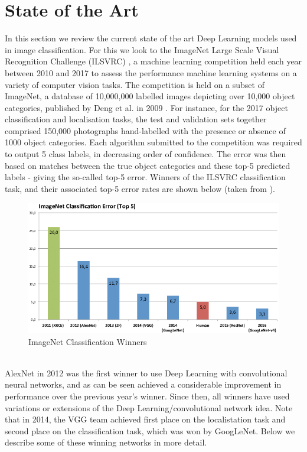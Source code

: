 \documentclass[11pt]{article} %
\theoremstyle{plain}
\theoremstyle{definition}
\begin{document}
\section{State of the Art}
In this section we review the current state of the art Deep Learning models used in image classification. For this we look to the ImageNet Large Scale Visual Recognition Challenge (ILSVRC) \cite{ILSVRC}, a machine learning competition held each year between 2010 and 2017 to assess the performance machine learning systems on a variety of computer vision tasks. The competition is held on a subset of ImageNet, a database of 10,000,000 labelled images depicting over 10,000 object categories, published by Deng et al. in 2009 \cite{imagenet}. For instance, for the 2017 object classification and localisation tasks, the test and validation sets together comprised 150,000 photographs hand-labelled with the presence or absence of 1000 object categories. Each algorithm submitted to the competition was required to output 5 class labels, in decreasing order of confidence. The error was then based on matches between the true object categories and these top-5 predicted labels - giving the so-called top-5 error. Winners of the ILSVRC classification task, and their associated top-5 error rates are shown below (taken from \cite{ILSVRC_Classification_Top5}).          
\begin{figure}[!ht]
  \centering    
  \caption{ImageNet Classification Winners}
  \label{fig:ILSVRC_Winners}
  \includegraphics[scale=0.35]{ILSVRC_Winners.png}
\end{figure}
\\
\noindent
AlexNet in 2012 was the first winner to use Deep Learning with convolutional neural networks, and as can be seen achieved a considerable improvement in performance over the previous year's winner. Since then, all winners have used variations or extensions of the Deep Learning/convolutional network idea. Note that in 2014, the VGG team achieved first place on the localistation task and second place on the classification task, which was won by GoogLeNet. Below we describe some of these winning networks in more detail.
\\
\\
\noindent
\end{document}
